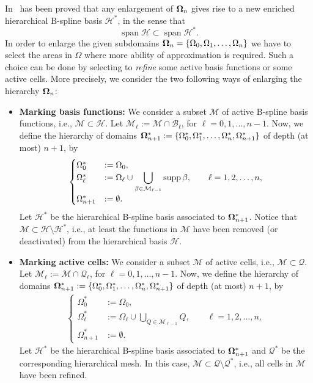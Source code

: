\documentclass[a4paper]{siamltex1213}
\newcommand{\D}{\displaystyle}
\DeclareMathOperator{\Span}{span}
\newcommand\BB{\mathcal B}
\newcommand\MM{\mathcal M}
\newcommand\QQ{\mathcal Q}
\newcommand\HH{\mathcal H}
\begin{document}
In~\cite{GJS14} has been proved that any enlargement of ${\bf\Omega}_n$ gives rise to a new enriched hierarchical B-spline basis $\HH^*$, in the sense that
$$\Span\HH\subset\Span\HH^*.$$
In order to enlarge the given subdomains ${\bf\Omega}_n = \{\Omega_0,\Omega_1,\dots,\Omega_n\}$ we have to select the areas in $\Omega$ where more ability of approximation is required. Such a choice can be done by selecting to \emph{refine} some active basis functions or some active cells. More precisely, we consider the two following ways of enlarging the hierarchy ${\bf\Omega}_n$:
\begin{itemize}
 \item {\bf Marking basis functions:} We consider a subset $\MM$ of active B-spline basis functions, i.e., $\MM\subset\HH$. Let $\MM_\ell:=\MM\cap\BB_\ell$, for $\ell = 0,1,\dots,n-1$. Now, we define the hierarchy of domains ${\bf\Omega}^*_{n+1} := 
\{\Omega_0^*,\Omega_1^*,\dots,\Omega_n^*,\Omega_{n+1}^*\}$ of depth (at most) 
$n+1$, by
\begin{align}\label{E:marking basis functions}
\begin{cases}\Omega_0^* &:=\Omega_0,\\
\Omega_{\ell}^* &:=\Omega_{\ell}\cup \D\bigcup_{\beta\in\MM_{\ell-1}}\supp 
\beta,\qquad \ell = 1,2,\dots,n,\\
\Omega_{n+1}^*&:= \emptyset.
\end{cases}
\end{align}
Let $\HH^*$ be the hierarchical B-spline basis associated to ${\bf\Omega}^*_{n+1}$. Notice that $\MM\subset\HH\setminus\HH^*$, i.e., at least the functions in $\MM$ have been removed (or deactivated) from the hierarchical basis $\HH$. 
\item {\bf Marking active cells:} We consider a subset $\MM$ of active cells, i.e., $\MM\subset\QQ$. Let $\MM_\ell:=\MM\cap\QQ_\ell$, for $\ell = 0,1,\dots,n-1$. Now, we define the hierarchy of domains ${\bf\Omega}^*_{n+1} := 
\{\Omega_0^*,\Omega_1^*,\dots,\Omega_n^*,\Omega_{n+1}^*\}$ of depth (at most) 
$n+1$, by
\begin{align}\label{E:marking active cells}
\begin{cases}\Omega_0^* &:=\Omega_0,\\
\Omega_{\ell}^* &:=\Omega_{\ell}\cup \D\bigcup_{Q\in\MM_{\ell-1}}Q,\qquad \ell = 1,2,\dots,n,\\
\Omega_{n+1}^*&:= \emptyset.
\end{cases}
\end{align}
Let $\HH^*$ be the hierarchical B-spline basis associated to ${\bf\Omega}^*_{n+1}$ and $\QQ^*$ be the corresponding hierarchical mesh. In this case, $\MM\subset\QQ\setminus\QQ^*$, i.e., all cells in $\MM$ have been refined. 
\end{itemize}
\end{document}
